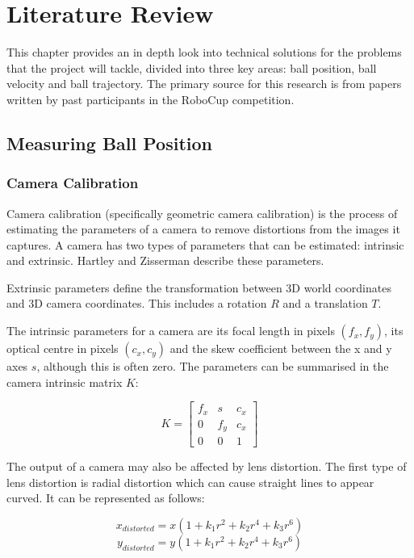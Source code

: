\chapter{Literature Review}
\label{chapter: 2}

This chapter provides an in depth look into technical solutions for the problems that the project will tackle, divided into three key areas: ball position, ball velocity and ball trajectory. The primary source for this research is from papers written by past participants in the RoboCup competition. 

\section{Measuring Ball Position}

\subsection{Camera Calibration}

Camera calibration (specifically geometric camera calibration) is the process of estimating the parameters of a camera to remove distortions from the images it captures. A camera has two types of parameters that can be estimated: intrinsic and extrinsic. Hartley and Zisserman \cite{Hartley2004} describe these parameters.

Extrinsic parameters define the transformation between 3D world coordinates and 3D camera coordinates. This includes a rotation $R$ and a translation $T$. 

The intrinsic parameters for a camera are its focal length in pixels $(f_x, f_y)$, its optical centre in pixels $(c_x, c_y)$ and the skew coefficient between the x and y axes $s$, although this is often zero. The parameters can be summarised in the camera intrinsic matrix $K$:

\[ K = 
\begin{bmatrix}
f_x & s & c_x\\
0 & f_y & c_x\\
0 & 0 & 1
\end{bmatrix}
\]

The output of a camera may also be affected by lens distortion. The first type of lens distortion is radial distortion which can cause straight lines to appear curved. It can be represented as follows:

\[ x_{distorted} = x(1+k_1 r^2 + k_2 r^4 + k_3 r^6) \]
\[ y_{distorted} = y(1+k_1 r^2 + k_2 r^4 + k_3 r^6) \]

